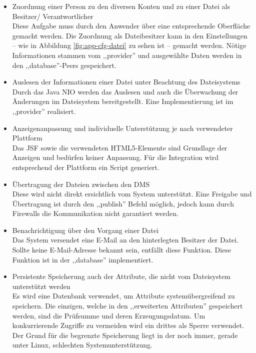 \documentclass[oneside, ngerman, toc=bibliography,bibliography=totoc,listof=entryprefix, open=right,numbers=noenddot,fontsize=12pt]{scrbook}
\begin{document}
\begin{itemize}
	\item Zuordnung einer Person zu den diversen Konten und zu einer Datei als Besitzer/ Verantwortlicher\\
	Diese Aufgabe muss durch den Anwender über eine entsprechende Oberfläche gemacht werden. Die Zuordnung als Dateibesitzer kann in den Einstellungen -- wie in Abbildung \ref{fig:app-cfg-datei} zu sehen ist -- gemacht werden. Nötige Informationen  stammen vom ,,provider'' und ausgewählte Daten werden in den ,,database''-Peers gespeichert.
	
	\item Auslesen der Informationen einer Datei unter Beachtung des Dateisystems \\
	Durch das Java NIO werden das Auslesen und auch die Überwachung der Änderungen im Dateisystem bereitgestellt.
    Eine Implementierung ist im ,,provider'' realisiert.

    \item Anzeigenanpassung und individuelle Unterstützung je nach verwendeter Plattform \\
	Das JSF sowie die verwendeten HTML5-Elemente sind Grundlage der Anzeigen und bedürfen keiner Anpassung. Für die Integration wird entsprechend der Plattform ein Script generiert.
	\item Übertragung der Dateien zwischen den DMS\\
   Diese wird nicht direkt ersichtlich  vom System unterstützt. Eine Freigabe und Übertragung ist durch den ,,publish'' Befehl möglich, jedoch kann durch Firewalls die Kommunikation nicht garantiert werden.  
	\item Benachrichtigung über den Vorgang einer Datei\\
	Das System versendet eine E-Mail an den hinterlegten Besitzer der Datei. Sollte keine E-Mail-Adresse bekannt sein, entfällt diese Funktion. Diese Funktion ist in der ,,database'' implementiert.
	\item Persistente Speicherung auch der Attribute, die nicht vom Dateisystem unterstützt werden\\
	Es wird eine Datenbank verwendet, um Attribute systemübergreifend zu speichern.
    Die einzigen, welche in den ,,erweiterten Attributen'' gespeichert werden, sind die Prüfsumme und deren Erzeugungsdatum. Um konkurrierende Zugriffe zu vermeiden wird ein drittes als Sperre verwendet. Der Grund für die begrenzte Speicherung liegt in der noch immer, gerade unter Linux, schlechten Systemunterstützung.


\end{itemize}
\end{document}

